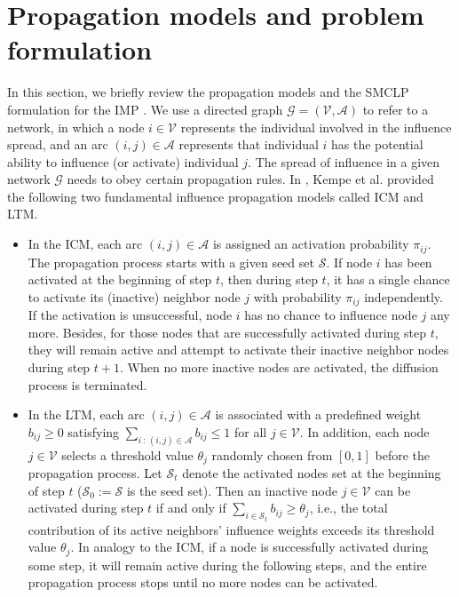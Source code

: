 \documentclass[a4paper,10pt]{article}
\newcommand{\st}{\,:\,}
\theoremstyle{plain}
\newcommand{\rev}[1]{{\color{black}#1}}
\newcommand{\revv}[1]{{#1}}
\begin{document}
	
	\section{Propagation models and problem formulation}
	\label{sect:pd}
	In this section, we briefly review the propagation models and the SMCLP formulation for the IMP \cite{Guney2019,Guney2020,Li2019}.
	We use a directed graph $\mathcal{G}=(\mathcal{V},\mathcal{A})$ to refer to a \revv{network}, 
	in which a node $i \in \mathcal{V}$ represents the individual involved in the influence spread,
	and an arc $(i,j)\in\mathcal{A}$ represents that individual $i$ has the potential ability to influence (or activate) individual $j$. 
	The spread of influence in a given \revv{network} $\mathcal{G}$ needs to obey certain propagation rules.
	In \cite{Kempe2003}, Kempe et al. provided the following two fundamental influence propagation models called ICM and LTM. 
	\begin{itemize}
		\item 
		In the ICM, each arc $(i,j)\in\mathcal{A}$ is assigned an activation probability $\pi_{ij}$. The propagation process starts with a given seed set $\mathcal{S}$.
		If node $i$ has been activated at the beginning of step $t$, then during step $t$, it has a single chance to activate its (inactive) neighbor node $j$ with probability $\pi_{ij}$ independently. 
		\rev{If the activation is unsuccessful, node $i$ has no chance to influence node $j$ any more.}
		Besides, for those nodes that are successfully activated during step $t$, they will remain active and attempt to activate their inactive neighbor nodes during step $t+1$. 
		When no more inactive nodes are activated, the diffusion process is terminated. %
		\item In the LTM, each arc $(i,j)\in\mathcal{A}$ is associated with a predefined weight $ b_{ij}\geq 0$ satisfying $\sum_{i\st(i,j)\in\mathcal{A}}b_{ij}\leq1$ for all $j \in \mathcal{V}$.   
		\revv{In addition}, each node \revv{$j\in\mathcal{V}$} selects a threshold value \revv{$\theta_j$}  randomly chosen from $[0,1]$ before the propagation process.
		Let $\mathcal{S}_t$ denote the activated nodes set at the beginning of step $t$ ($\mathcal{S}_0:=\mathcal{S}$ is the seed set). 
		Then an inactive node $j\in\mathcal{V}$ can be activated during step $t$ if and only if $\sum_{i\in \mathcal{S}_t}b_{ij}\geq\theta_j$, i.e., the total contribution of its active neighbors' influence weights exceeds its threshold value $\theta_j$. 
		In analogy to the ICM, if \revv{a node} is successfully activated during some step, it will remain active during the following steps, and the entire propagation process stops until no more nodes can be activated.
	\end{itemize}
\end{document}
